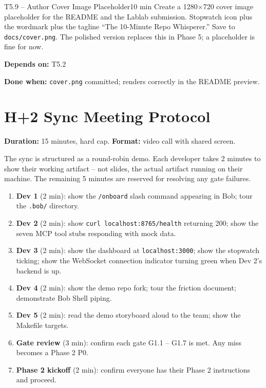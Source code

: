 \documentclass[11pt,letterpaper]{article}
\newcommand{\acceptance}[1]{\par\smallskip\textcolor{ibmgreen}{\textbf{Done when:}} #1}
\newcommand{\depends}[1]{\par\smallskip\textcolor{ibmorange}{\textbf{Depends on:}} #1}
\begin{document}
\begin{task}{T5.9 -- Author Cover Image Placeholder}{10 min}
Create a 1280$\times$720 cover image placeholder for the README and the Lablab submission. Stopwatch icon plus the wordmark plus the tagline ``The 10-Minute Repo Whisperer.'' Save to \texttt{docs/cover.png}. The polished version replaces this in Phase 5; a placeholder is fine for now.
\depends{T5.2}
\acceptance{\texttt{cover.png} committed; renders correctly in the README preview.}
\end{task}

\section{H+2 Sync Meeting Protocol}

\textbf{Duration:} 15 minutes, hard cap. \textbf{Format:} video call with shared screen.

The sync is structured as a round-robin demo. Each developer takes 2 minutes to show their working artifact -- not slides, the actual artifact running on their machine. The remaining 5 minutes are reserved for resolving any gate failures.

\begin{enumerate}
  \item \textbf{Dev 1} (2 min): show the \texttt{/onboard} slash command appearing in Bob; tour the \texttt{.bob/} directory.
  \item \textbf{Dev 2} (2 min): show \texttt{curl localhost:8765/health} returning 200; show the seven MCP tool stubs responding with mock data.
  \item \textbf{Dev 3} (2 min): show the dashboard at \texttt{localhost:3000}; show the stopwatch ticking; show the WebSocket connection indicator turning green when Dev 2's backend is up.
  \item \textbf{Dev 4} (2 min): show the demo repo fork; tour the friction document; demonstrate Bob Shell piping.
  \item \textbf{Dev 5} (2 min): read the demo storyboard aloud to the team; show the Makefile targets.
  \item \textbf{Gate review} (3 min): confirm each gate G1.1 -- G1.7 is met. Any miss becomes a Phase 2 P0.
  \item \textbf{Phase 2 kickoff} (2 min): confirm everyone has their Phase 2 instructions and proceed.
\end{enumerate}
\end{document}
